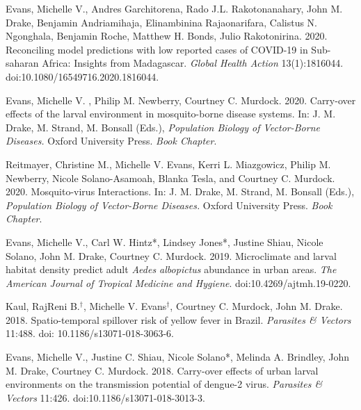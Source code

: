 \begin{etaremune}
\item \textcolor{awesome}{Evans, Michelle V.}, Andres Garchitorena, Rado J.L. Rakotonanahary, John M. Drake, Benjamin Andriamihaja, Elinambinina Rajaonarifara, Calistus N. Ngonghala, Benjamin Roche, Matthew H. Bonds, Julio Rakotonirina. 2020. Reconciling model predictions with low reported cases of COVID-19 in Sub-saharan Africa: Insights from Madagascar. \textit{Global Health Action} 13(1):1816044. \\doi:10.1080/16549716.2020.1816044. \smallskip

\item \textcolor{awesome}{Evans, Michelle V. }, Philip M. Newberry, Courtney C. Murdock. 2020. Carry-over effects of the larval environment in mosquito-borne disease systems. In: J. M. Drake, M. Strand, M. Bonsall (Eds.), \textit{Population Biology of Vector-Borne Diseases.} Oxford University Press. \textit{Book Chapter}.\smallskip

\item Reitmayer, Christine M., \textcolor{awesome}{Michelle V. Evans}, Kerri L. Miazgowicz, Philip M. Newberry, Nicole Solano-Asamoah, Blanka Tesla, and Courtney C. Murdock. 2020. Mosquito-virus Interactions. In: J. M. Drake, M. Strand, M. Bonsall (Eds.), \textit{Population Biology of Vector-Borne Diseases.} Oxford University Press. \textit{Book Chapter}. \smallskip

\item \textcolor{awesome}{Evans, Michelle V.}, Carl W. Hintz*, Lindsey Jones*, Justine Shiau, Nicole Solano, John M. Drake, Courtney C. Murdock. 2019. Microclimate and larval habitat density predict adult \textit{Aedes albopictus} abundance in urban areas. \textit{The American Journal of Tropical Medicine and Hygiene}. doi:10.4269/ajtmh.19-0220. \smallskip

\item Kaul, RajReni B.$^\dagger$, \textcolor{awesome}{Michelle V. Evans}$^\dagger$, Courtney C. Murdock, John M. Drake. 2018. Spatio-temporal spillover risk of yellow fever in Brazil. \textit{Parasites \& Vectors} 11:488. doi: 10.1186/s13071-018-3063-6.
\smallskip

\item \textcolor{awesome}{Evans, Michelle V.}, Justine C. Shiau, Nicole Solano*, Melinda A. Brindley, John M. Drake, Courtney C. Murdock. 2018. Carry-over effects of urban larval environments on the transmission potential of dengue-2 virus. \textit{Parasites \& Vectors} 11:426. doi:10.1186/s13071-018-3013-3.


\end{etaremune}
